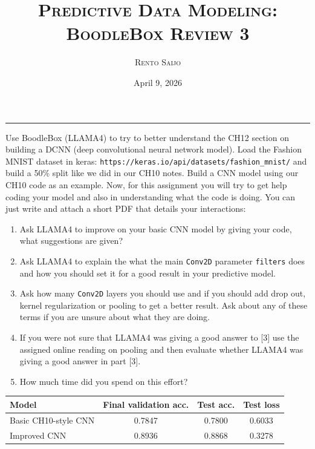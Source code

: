 \documentclass[10pt]{extarticle}
\title{\centering\Large\textsc{\textbf{Predictive Data Modeling: BoodleBox Review 3}}}
\author{\large \textsc{Rento Saijo}}
\date{April 9, 2026}
\begin{document}
\maketitle
\thispagestyle{fancy}
\vspace{-1em}\noindent\rule{\linewidth}{0.6pt}\vspace{0.5em}

\begin{problem}[Instructions]
Use BoodleBox (LLAMA4) to try to better understand the CH12 section on building a DCNN (deep convolutional neural network model). Load the Fashion MNIST dataset in keras: \texttt{https://keras.io/api/datasets/fashion\_mnist/} and build a 50\% split like we did in our CH10 notes. Build a CNN model using our CH10 code as an example. Now, for this assignment you will try to get help coding your model and also in understanding what the code is doing. You can just write and attach a short PDF that details your interactions:

\begin{enumerate}[label=\arabic*., leftmargin=2em]
\item Ask LLAMA4 to improve on your basic CNN model by giving your code, what suggestions are given?
\item Ask LLAMA4 to explain the what the main \texttt{Conv2D} parameter \texttt{filters} does and how you should set it for a good result in your predictive model.
\item Ask how many \texttt{Conv2D} layers you should use and if you should add drop out, kernel regularization or pooling to get a better result. Ask about any of these terms if you are unsure about what they are doing.
\item If you were not sure that LLAMA4 was giving a good answer to [3] use the assigned online reading on pooling and then evaluate whether LLAMA4 was giving a good answer in part [3].
\item How much time did you spend on this effort?
\end{enumerate}
\end{problem}

\begin{center}
\begin{tabular}{l c c c}
\hline
Model & Final validation acc. & Test acc. & Test loss\\
\hline
Basic CH10-style CNN & 0.7847 & 0.7800 & 0.6033\\
Improved CNN & 0.8936 & 0.8868 & 0.3278\\
\hline
\end{tabular}
\end{center}
\end{document}
